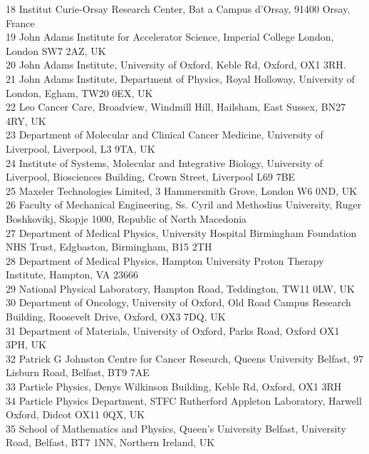 {\begin{tabbing}
     18 \> Institut Curie-Orsay Research Center, Bat a Campus d'Orsay, 91400 Orsay, France\\
     19 \> John Adams Institute for Accelerator Science, Imperial College London, London SW7 2AZ, UK\\
     20 \> John Adams Institute, University of Oxford, Keble Rd, Oxford, OX1 3RH.\\
     21 \> John Adams Institute, Department of Physics, Royal Holloway, University of London, Egham, TW20 0EX, UK\\
     22 \> Leo Cancer Care, Broadview, Windmill Hill, Hailsham, East Sussex, BN27 4RY, UK\\
     23 \> Department of Molecular and Clinical Cancer Medicine, University of Liverpool, Liverpool, L3 9TA, UK\\
     24 \> Institute of Systems, Molecular and Integrative Biology, University of Liverpool, Biosciences Building, Crown Street, Liverpool L69 7BE\\
     25 \> Maxeler Technologies Limited, 3 Hammersmith Grove, London W6 0ND, UK\\
     26 \> Faculty of Mechanical Engineering, Ss. Cyril and Methodius University,  Ruger Boshkovikj, Skopje 1000, Republic of North Macedonia\\
     27 \> Department of Medical Physics, University Hospital Birmingham Foundation NHS Trust, Edgbaston, Birmingham, B15 2TH\\
     28 \> Department of Medical Physics, Hampton University Proton Therapy Institute, Hampton, VA 23666\\
     29 \> National Physical Laboratory, Hampton Road, Teddington, TW11 0LW, UK\\
     30 \> Department of Oncology, University of Oxford, Old Road Campus Research Building, Roosevelt Drive, Oxford, OX3 7DQ, UK\\
     31 \> Department of Materials, University of Oxford, Parks Road, Oxford OX1 3PH, UK\\
     32 \> Patrick G Johnston Centre for Cancer Research, Queens University Belfast, 97 Lisburn Road, Belfast, BT9 7AE\\
     33 \> Particle Physics, Denys Wilkinson Building, Keble Rd, Oxford, OX1 3RH\\
     34 \> Particle Physics Department, STFC Rutherford Appleton Laboratory, Harwell Oxford, Didcot OX11 0QX, UK\\
     35 \> School of Mathematics and Physics, Queen's University Belfast, University Road, Belfast, BT7 1NN, Northern Ireland, UK\\

\end{tabbing}}

